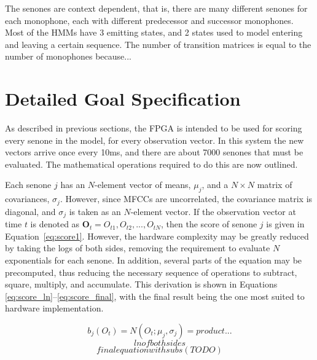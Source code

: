 	The senones are context dependent, that is, there are many different senones for each monophone, each with different predecessor and successor monophones.  Most of the HMMs have 3 emitting states, and 2 states used to model entering and leaving a certain sequence. The number of transition matrices is equal to the number of monophones because...

\section{Detailed Goal Specification} %
\label{sec:goal_specification}
	As described in previous sections, the FPGA is intended to be used for scoring every senone in the model, for every observation vector.  In this system the new vectors arrive once every 10ms, and there are about 7000 senones that must be evaluated.  The mathematical operations required to do this are now outlined. %

	Each senone $j$ has an $N$-element vector of means, $\mu_j$, and a $N\times N$ matrix of covariances, $\sigma_j$.  However, since MFCCs are uncorrelated, the covariance matrix is diagonal, and $\sigma_j$ is taken as an $N$-element vector.  If the observation vector at time $t$ is denoted as $\mathbf{O}_t = {O_{t1}, O_{t2}, ..., O_{tN}}$, then the score of senone $j$ is given in Equation~\ref{eq:score1}.  However, the hardware complexity may be greatly reduced by taking the logs of both sides, removing the requirement to evaluate $N$ exponentials for each senone.  In addition, several parts of the equation may be precomputed, thus reducing the necessary sequence of operations to subtract, square, multiply, and accumulate.  This derivation is shown in Equations \ref{eq:score_ln}--\ref{eq:score_final}, with the final result being the one most suited to hardware implementation.

	\begin{equation}
	\label{eq:score1}
		b_j(O_t) = N(O_t; \mu_j,\sigma_j) = product...
	\end{equation}
	\begin{equation}
	\label{eq:score_ln}
		ln of both sides
	\end{equation}
	\begin{equation}
	\label{eq:score_final}
		final equation with subs (TODO)
	\end{equation}

